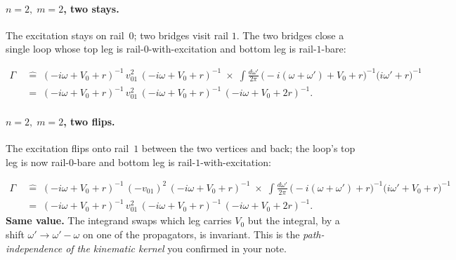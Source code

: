 \documentclass[11pt,a4paper]{article}
\newcommand{\Gex}{(-i\omega+V_{0}+r)^{-1}}
\begin{document}
\paragraph{$n{=}2,\;m{=}2$, two stays.}
The excitation stays on rail~$0$; two bridges visit rail $1$. The two
bridges close a single loop whose top leg is rail-$0$-with-excitation and
bottom leg is rail-$1$-bare:
\begin{center}
\end{center}
\begin{align*}
\Gamma \;&\widehat=\; \Gex\,v_{01}^{2}\,\Gex
\;\times\;\int\!\frac{d\omega'}{2\pi}\,
\big(-i(\omega+\omega')+V_{0}+r\big)^{-1}\big(i\omega'+r\big)^{-1}\\
&=\;\Gex\,v_{01}^{2}\,\Gex\,(-i\omega+V_{0}+2r)^{-1}.
\end{align*}

\paragraph{$n{=}2,\;m{=}2$, two flips.}
The excitation flips onto rail~$1$ between the two vertices and back; the
loop's top leg is now rail-$0$-bare and bottom leg is rail-$1$-with-excitation:
\begin{center}
\end{center}
\begin{align*}
\Gamma \;&\widehat=\; \Gex\,(-v_{01})^{2}\,\Gex
\;\times\;\int\!\frac{d\omega'}{2\pi}\,
\big(-i(\omega+\omega')+r\big)^{-1}\big(i\omega'+V_{0}+r\big)^{-1}\\
&=\;\Gex\,v_{01}^{2}\,\Gex\,(-i\omega+V_{0}+2r)^{-1}.
\end{align*}
\textbf{Same value.} The integrand swaps which leg carries $V_{0}$ but
the integral, by a shift $\omega'\!\to\!\omega'\!-\!\omega$ on one of
the propagators, is invariant. This is the
\emph{path-independence of the kinematic kernel} you confirmed in your
note.
\end{document}
